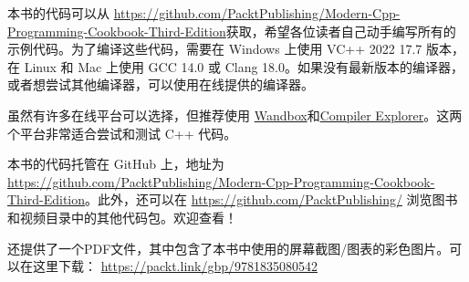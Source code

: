
本书的代码可以从 \url{https://github.com/PacktPublishing/Modern-Cpp-Programming-Cookbook-Third-Edition}获取，希望各位读者自己动手编写所有的示例代码。为了编译这些代码，需要在 Windows 上使用 VC++ 2022 17.7 版本，在 Linux 和 Mac 上使用 GCC 14.0 或 Clang 18.0。如果没有最新版本的编译器，或者想尝试其他编译器，可以使用在线提供的编译器。

虽然有许多在线平台可以选择，但推荐使用 \href{https://wandbox.org/}{Wandbox}和\href{https://godbolt.org/}{Compiler Explorer}。这两个平台非常适合尝试和测试 C++ 代码。


本书的代码托管在 GitHub 上，地址为 \url{https://github.com/PacktPublishing/Modern-Cpp-Programming-Cookbook-Third-Edition}。此外，还可以在 \url{https://github.com/PacktPublishing/} 浏览图书和视频目录中的其他代码包。欢迎查看！


还提供了一个PDF文件，其中包含了本书中使用的屏幕截图/图表的彩色图片。可以在这里下载： \url{https://packt.link/gbp/9781835080542}






